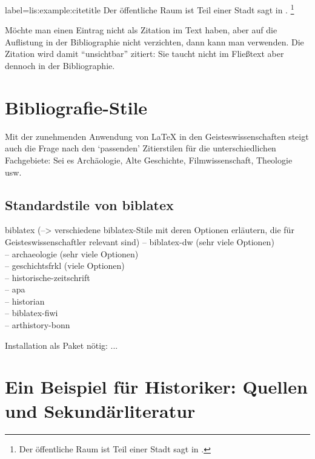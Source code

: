 \begin{lfgwexample}{label={lis:example:citetitle}}
Der öffentliche Raum ist Teil einer Stadt sagt \citeauthor{Osland2016} in .
\footnote{Der öffentliche Raum ist Teil einer Stadt sagt \citeauthor{Osland2016} in .}
\end{lfgwexample}


Möchte man einen Eintrag nicht als Zitation im Text haben, 
aber auf die Auflistung in der Bibliographie nicht verzichten,
dann kann man  verwenden.
Die Zitation wird damit \enquote{unsichtbar} zitiert:
Sie taucht nicht im Fließtext aber dennoch in der Bibliographie.




\section{Bibliografie-Stile}\label{sec:bibliografiestile}
Mit der zunehmenden Anwendung von \LaTeX{} in den Geisteswissenschaften steigt auch die Frage nach den \enquote*{passenden} Zitierstilen für die unterschiedlichen Fachgebiete:
Sei es Archäologie, Alte Geschichte, Filmwissenschaft, Theologie usw.
\subsection{Standardstile von biblatex}

biblatex (--> verschiedene biblatex-Stile mit deren Optionen erläutern, die für Geisteswissenschaftler relevant sind)
-- biblatex-dw (sehr viele Optionen)\\
-- archaeologie (sehr viele Optionen)\\
-- geschichtsfrkl (viele Optionen)\\
-- historische-zeitschrift\\
-- apa\\
-- historian\\
-- biblatex-fiwi\\
-- arthistory-bonn\\


Installation als Paket nötig:
...



\section{Ein Beispiel für Historiker: Quellen und Sekundärliteratur}\label{sec:bibliografie}


